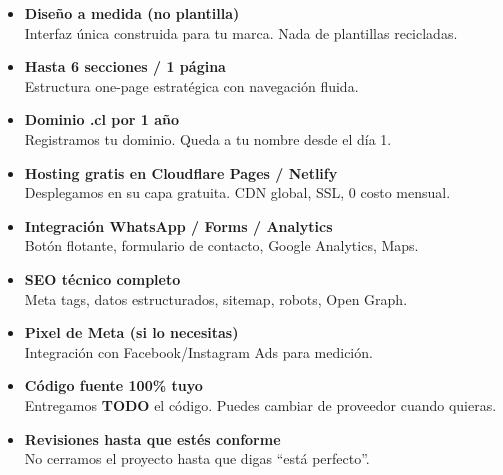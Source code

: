 \documentclass[11pt, a4paper]{article}
\begin{document}
  \noindent
  \begin{minipage}[t]{0.48\textwidth}
    \begin{itemize}[label=
    \color{mainblue}
    \faCheckCircle, leftmargin=*, itemsep=3pt]
      \item \textbf{Diseño a medida (no plantilla)} \\[1mm]
        {\small\color{basicgray}Interfaz única construida para tu marca. Nada de plantillas recicladas.}

      \item \textbf{Hasta 6 secciones / 1 página} \\[1mm]
        {\small\color{basicgray}Estructura one-page estratégica con navegación fluida.}

      \item \textbf{Dominio .cl por 1 año} \\[1mm]
        {\small\color{basicgray}Registramos tu dominio. Queda a tu nombre desde el día 1.}

      \item \textbf{Hosting gratis en Cloudflare Pages / Netlify} \\[1mm]
        {\small\color{basicgray}Desplegamos en su capa gratuita. CDN global, SSL, 0 costo mensual.}

      \item \textbf{Integración WhatsApp / Forms / Analytics} \\[1mm]
        {\small\color{basicgray}Botón flotante, formulario de contacto, Google Analytics, Maps.}
    \end{itemize}
  \end{minipage}
  \hfill
  \begin{minipage}[t]{0.48\textwidth}
    \begin{itemize}[label=
    \color{mainblue}
    \faCheckCircle, leftmargin=*, itemsep=3pt]
      \item \textbf{SEO técnico completo} \\[1mm]
        {\small\color{basicgray}Meta tags, datos estructurados, sitemap, robots, Open Graph.}

      \item \textbf{Pixel de Meta (si lo necesitas)} \\[1mm]
        {\small\color{basicgray}Integración con Facebook/Instagram Ads para medición.}

      \item \textbf{Código fuente 100\% tuyo} \\[1mm]
        {\small\color{basicgray}Entregamos \textbf{TODO} el código. Puedes cambiar de proveedor cuando quieras.}

      \item \textbf{Revisiones hasta que estés conforme} \\[1mm]
        {\small\color{basicgray}No cerramos el proyecto hasta que digas ``está perfecto''.}
    \end{itemize}
  \end{minipage}
\end{document}
